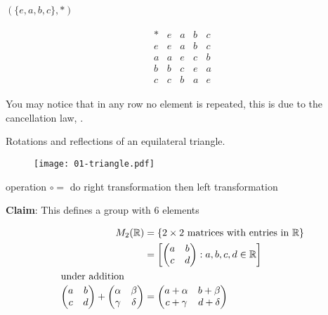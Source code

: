 \begin{example}
\protect\hypertarget{exm:nine}{}\label{exm:nine}\((\{e, a, b, c\}, *)\)

\begin{align*}
    \begin{array}{c|cccc}
        * & e & a & b & c \\
        \hline
        e & e & a & b & c \\
        a & a & e & c & b \\
        b & b & c & e & a \\
        c & c & b & a & e
    \end{array} 
\end{align*}

You may notice that in any row no element is repeated, this is due to the cancellation law, .
\end{example}

\begin{example}
\protect\hypertarget{exm:triangle}{}\label{exm:triangle}Rotations and reflections of an equilateral triangle.

\begin{figure}
  \centering
  \texttt{[image: 01-triangle.pdf]}
\end{figure}

operation \(\circ =\) do right transformation then left transformation

\textbf{Claim}: This defines a group with 6 elements
\end{example}

\begin{example}
\begin{align*}
    M_2(\mathbb{R}) &= \{ 2 \times 2 \text{ matrices with entries in } \mathbb{R} \} \\
    &= \left[ \begin{pmatrix} a & b \\ c & d \end{pmatrix} : a, b, c, d \in \mathbb{R} \right] \\
    \intertext{under addition}
    \begin{pmatrix}
    a & b \\
    c & d
    \end{pmatrix} + 
    \begin{pmatrix}
    \alpha & \beta \\
    \gamma & \delta
    \end{pmatrix} &=
    \begin{pmatrix}
    a + \alpha & b + \beta \\
    c + \gamma & d + \delta
    \end{pmatrix}
\end{align*}
\end{example}

